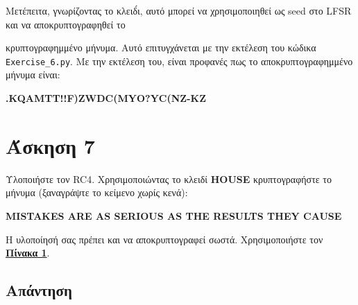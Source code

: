 \documentclass[12pt]{article}
\begin{document}
Mετέπειτα, γνωρίζοντας το κλειδ́ι, αυτό μπορεί να χρησιμοποιηθεί ως seed στο LFSR και να αποκρυπτογραφηθεί το 

κρυπτογραφημμένο μήνυμα. Αυτό επιτυγχάνεται με την εκτέλεση του κώδικα \texttt{Exercise\_6.py}.
\newline
\newline
Με την εκτέλεση του, είναι προφανές πως το αποκρυπτογραφημμένο μήνυμα είναι: 
\begin{center}
\textbf{.KQAMTT!!F)ZWDC(MYO?YC(NZ-KZ}    
\end{center}
\hfill \blacksquare
\section*{Άσκηση 7}
Υλοποιήστε τον RC4. Χρησιμοποιώντας το κλειδί \textbf{HOUSE} κρυπτογραφήστε το μήνυμα (ξαναγράψτε το κείμενο χωρίς κενά):

\begin{center}
\textbf{MISTAKES ARE AS SERIOUS AS THE RESULTS THEY CAUSE}
\end{center}

Η υλοποίησή σας πρέπει και να αποκρυπτογραφεί σωστά. Χρησιμοποιήστε τον 
\textbf{\protect\hyperref[πίνακας 1]{Πίνακα 1}}.


\subsection*{Απάντηση}
\end{document}
